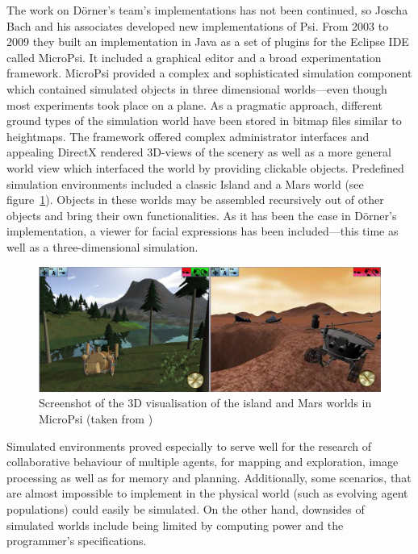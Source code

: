 The work on Dörner's team's implementations has not been continued, so Joscha Bach and his associates developed new implementations of Psi. From 2003 to 2009 they built an implementation in Java as a set of plugins for the Eclipse IDE called MicroPsi. It included a graphical editor and a broad experimentation framework. MicroPsi provided a complex and sophisticated simulation component which contained simulated objects in three dimensional worlds---even though most experiments took place on a plane. As a pragmatic approach, different ground types of the simulation world have been stored in bitmap files similar to heightmaps. The framework offered complex administrator interfaces and appealing DirectX rendered 3D-views of the scenery as well as a more general world view which interfaced the world by providing clickable objects. Predefined simulation environments included a classic Island and a Mars world (see figure~\ref{micropsi_3d_screen}). Objects in these worlds may be assembled recursively out of other objects and bring their own functionalities. As it has been the case in Dörner's implementation, a viewer for facial expressions has been included---this time as well as a three-dimensional simulation.~\cite{Bach:2009:PSI:1611304}


\begin{figure}[h]
  \centering
    \includegraphics[width=14cm]{graphics/micropsi_3d_screen}
  \caption{Screenshot of the 3D visualisation of the island and Mars worlds in MicroPsi (taken from \cite{Bach:2009:PSI:1611304})}
  \label{micropsi_3d_screen}
\end{figure}

Simulated environments proved especially to serve well for the research of collaborative behaviour of multiple agents, for mapping and exploration, image processing as well as for memory and planning. Additionally, some scenarios, that are almost impossible to implement in the physical world (such as evolving agent populations) could easily be simulated. On the other hand, downsides of simulated worlds include being limited by computing power and the programmer's specifications.~\cite{Bach:2009:PSI:1611304}

